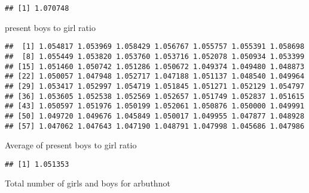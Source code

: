 \documentclass[]{article}
\newenvironment{Shaded}{\begin{snugshade}}{\end{snugshade}}
\newcommand{\KeywordTok}[1]{\textcolor[rgb]{0.13,0.29,0.53}{\textbf{#1}}}
\newcommand{\NormalTok}[1]{#1}
\newcommand{\OperatorTok}[1]{\textcolor[rgb]{0.81,0.36,0.00}{\textbf{#1}}}
\newcommand{\StringTok}[1]{\textcolor[rgb]{0.31,0.60,0.02}{#1}}
\begin{document}
\begin{Shaded}
\end{Shaded}

\begin{verbatim}
## [1] 1.070748
\end{verbatim}

present boys to girl ratio

\begin{Shaded}
\end{Shaded}

\begin{verbatim}
##  [1] 1.054817 1.053969 1.058429 1.056767 1.055757 1.055391 1.058698
##  [8] 1.055449 1.053820 1.053760 1.053716 1.052078 1.050934 1.053399
## [15] 1.051460 1.050742 1.051286 1.050672 1.049374 1.049480 1.048873
## [22] 1.050057 1.047948 1.052717 1.047188 1.051137 1.048540 1.049964
## [29] 1.053417 1.052997 1.054719 1.051845 1.051271 1.052129 1.054797
## [36] 1.053605 1.052538 1.052569 1.052657 1.051749 1.052837 1.051615
## [43] 1.050597 1.051976 1.050199 1.052061 1.050876 1.050000 1.049991
## [50] 1.049720 1.049676 1.045849 1.050017 1.049955 1.047877 1.048928
## [57] 1.047062 1.047643 1.047190 1.048791 1.047998 1.045686 1.047986
\end{verbatim}

Average of present boys to girl ratio

\begin{Shaded}
\end{Shaded}

\begin{verbatim}
## [1] 1.051353
\end{verbatim}

Total number of girls and boys for arbuthnot
\end{document}
